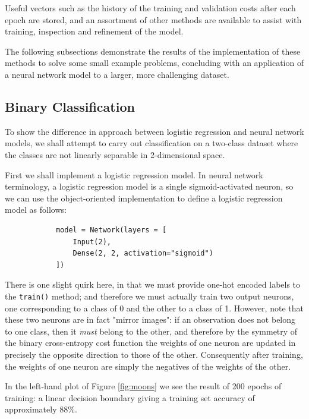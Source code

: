 \documentclass{article}[11pt]
\begin{document}
    
    Useful vectors such as the history of the training and validation costs after each epoch are stored, and an assortment of other methods are available to assist with training, inspection and refinement of the model.
    
    The following subsections demonstrate the results of the implementation of these methods to solve some small example problems, concluding with an application of a neural network model to a larger, more challenging dataset.
    
    

    \subsection{Binary Classification}
        
        To show the difference in approach between logistic regression and neural network models, we shall attempt to carry out classification on a two-class dataset where the classes are not linearly separable in 2-dimensional space.
        
        First we shall implement a logistic regression model. In neural network terminology, a logistic regression model is a single sigmoid-activated neuron, so we can use the object-oriented implementation to define a logistic regression model as follows:
        
        \begin{verbatim}
            model = Network(layers = [
                Input(2),
                Dense(2, 2, activation="sigmoid")
            ])
        \end{verbatim}
        
        There is one slight quirk here, in that we must provide one-hot encoded labels to the \texttt{train()} method; and therefore we must actually train two output neurons, one corresponding to a class of 0 and the other to a class of 1. However, note that these two neurons are in fact "mirror images": if an observation does not belong to one class, then it \textit{must} belong to the other, and therefore by the symmetry of the binary cross-entropy cost function the weights of one neuron are updated in precisely the opposite direction to those of the other. Consequently after training, the weights of one neuron are simply the negatives of the weights of the other.
        
        In the left-hand plot of Figure \ref{fig:moons} we see the result of 200 epochs of training: a linear decision boundary giving a training set accuracy of approximately 88\%.
        
\end{document}

